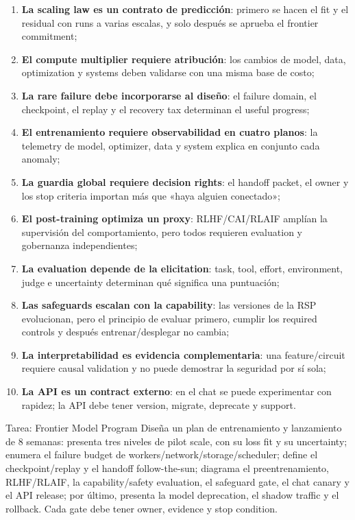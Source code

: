\documentclass[a4paper]{article}
\begin{document}
\begin{enumerate}
  \item \textbf{La scaling law es un contrato de predicción}: primero se hacen el fit y el residual con runs a varias escalas, y solo después se aprueba el frontier commitment;
  \item \textbf{El compute multiplier requiere atribución}: los cambios de model, data, optimization y systems deben validarse con una misma base de costo;
  \item \textbf{La rare failure debe incorporarse al diseño}: el failure domain, el checkpoint, el replay y el recovery tax determinan el useful progress;
  \item \textbf{El entrenamiento requiere observabilidad en cuatro planos}: la telemetry de model, optimizer, data y system explica en conjunto cada anomaly;
  \item \textbf{La guardia global requiere decision rights}: el handoff packet, el owner y los stop criteria importan más que «haya alguien conectado»;
  \item \textbf{El post-training optimiza un proxy}: RLHF/CAI/RLAIF amplían la supervisión del comportamiento, pero todos requieren evaluation y gobernanza independientes;
  \item \textbf{La evaluation depende de la elicitation}: task, tool, effort, environment, judge e uncertainty determinan qué significa una puntuación;
  \item \textbf{Las safeguards escalan con la capability}: las versiones de la RSP evolucionan, pero el principio de evaluar primero, cumplir los required controls y después entrenar/desplegar no cambia;
  \item \textbf{La interpretabilidad es evidencia complementaria}: una feature/circuit requiere causal validation y no puede demostrar la seguridad por sí sola;
  \item \textbf{La API es un contract externo}: en el chat se puede experimentar con rapidez; la API debe tener version, migrate, deprecate y support.
\end{enumerate}

\begin{importantbox}{Tarea: Frontier Model Program}
Diseña un plan de entrenamiento y lanzamiento de 8 semanas: presenta tres niveles de pilot scale, con su loss fit y su uncertainty; enumera el failure budget de workers/network/storage/scheduler; define el checkpoint/replay y el handoff follow-the-sun; diagrama el preentrenamiento, RLHF/RLAIF, la capability/safety evaluation, el safeguard gate, el chat canary y el API release; por último, presenta la model deprecation, el shadow traffic y el rollback. Cada gate debe tener owner, evidence y stop condition.
\end{importantbox}
\end{document}
